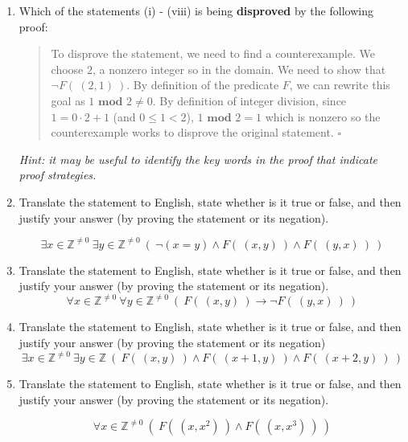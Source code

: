 \begin{enumerate}[labelindent=0pt, leftmargin=0pt]
\begin{enumerate}
    \item
    Which of the statements (i) - (viii) is being {\bf disproved} by the following proof:
    
    \begin{quote}
      To disprove the statement, we need to find a counterexample. We choose $2$, a nonzero
      integer so in the domain. We need to show that $\lnot F(~(2,1)~)$. By definition of the predicate $F$, we 
      can rewrite this goal as $1 \textbf{ mod } 2 \neq 0$. By definition of integer division, since 
      $1 = 0 \cdot 2  + 1$ (and $0 \leq 1 < 2$), $1 \textbf { mod } 2 = 1$ which is nonzero so the counterexample works to 
      disprove the original statement.
       $\square$
    \end{quote}
    
    {\it Hint: it may be useful to 
    identify the key words in the proof that indicate proof strategies.}
    
    \item 
    Translate the statement to English, state whether is it true or false, and then justify your answer (by proving the statement or its negation).

    $$\exists x \in \mathbb{Z}^{\neq 0}~ \exists y \in \mathbb{Z}^{\neq 0} ~(~\lnot(x = y) \land F(~(x,y)~) \land F(~(y,x)~)~)$$
    
    \item 
    Translate the statement to English, state whether is it true or false, and then justify your answer (by proving the statement or its negation).
    $$\forall x \in \mathbb{Z}^{\neq 0}~ \forall y \in \mathbb{Z}^{\neq 0} ~(~F(~(x,y)~) \to \lnot F(~(y,x)~)~)$$
    
    \item 
    Translate the statement to English, state whether is it true or false, and then justify your answer (by proving the statement or its negation)
    $$\exists x \in \mathbb{Z}^{\neq 0}~ \exists y \in \mathbb{Z}~(~F(~(x,y)~) \land  F(~(x+1, y)~) \land F(~(x+2, y)~)~)$$
    
    \item 
    Translate the statement to English, state whether is it true or false, and then justify your answer (by proving the statement or its negation).
 
    $$\forall x \in \mathbb{Z}^{\neq 0}~ (~F(~(x,x^2)~) \land F(~(x,x^3)~)~)$$
    
    \end{enumerate}
    

\end{enumerate}
